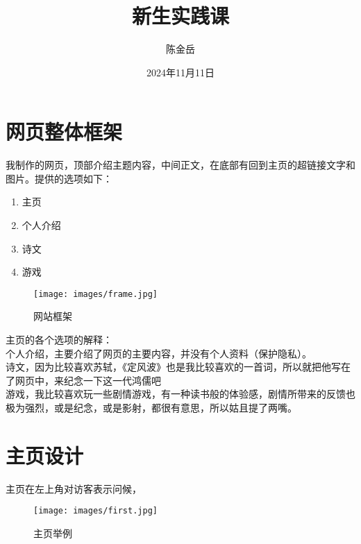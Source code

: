 \documentclass[supercite]{Experimental_Report}
\title{~~~~~~新生实践课~~~~~~}
\author{陈金岳}
\date{2024年11月11日}
\theoremstyle{definition}
\begin{document}
\maketitle

\clearpage


\tableofcontents[level=2]

\clearpage


\section{网页整体框架}
  	我制作的网页，顶部介绍主题内容，中间正文，在底部有回到主页的超链接文字和图片。提供的选项如下：

\begin{enumerate}
	\renewcommand{\labelenumi}{\theenumi)}
	\item 主页
	\item 个人介绍
	\item 诗文
	\item 游戏
	
\end{enumerate}
\begin{figure}[h] %
	\begin{center}
		\texttt{[image: images/frame.jpg]}
		\caption{网站框架}
		\label{fig1-1}
	\end{center}
\end{figure}
	主页的各个选项的解释：\\个人介绍，主要介绍了网页的主要内容，并没有个人资料（保护隐私）。\\诗文，因为比较喜欢苏轼，《定风波》也是我比较喜欢的一首词，所以就把他写在了网页中，来纪念一下这一代鸿儒吧\\游戏，我比较喜欢玩一些剧情游戏，有一种读书般的体验感，剧情所带来的反馈也极为强烈，或是纪念，或是影射，都很有意思，所以姑且提了两嘴。

\section{主页设计}

主页在左上角对访客表示问候，

\begin{figure}[h]
	\begin{center}
		\texttt{[image: images/first.jpg]}
		\caption{主页举例}
		\label{fig2-1}
	\end{center}
\end{figure}
\end{document}
